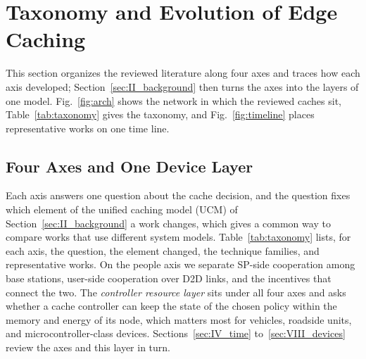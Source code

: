 \section{Taxonomy and Evolution of Edge Caching}
\label{sec:III_unified}

This section organizes the reviewed literature along four axes and traces how each axis developed; Section~\ref{sec:II_background} then turns the axes into the layers of one model. Fig.~\ref{fig:arch} shows the network in which the reviewed caches sit, Table~\ref{tab:taxonomy} gives the taxonomy, and Fig.~\ref{fig:timeline} places representative works on one time line.



\subsection{Four Axes and One Device Layer}
Each axis answers one question about the cache decision, and the question fixes which element of the unified caching model (UCM) of Section~\ref{sec:II_background} a work changes, which gives a common way to compare works that use different system models. Table~\ref{tab:taxonomy} lists, for each axis, the question, the element changed, the technique families, and representative works. On the people axis we separate SP-side cooperation among base stations, user-side cooperation over D2D links, and the incentives that connect the two. The \emph{controller resource layer} sits under all four axes and asks whether a cache controller can keep the state of the chosen policy within the memory and energy of its node, which matters most for vehicles, roadside units, and microcontroller-class devices. Sections~\ref{sec:IV_time} to~\ref{sec:VIII_devices} review the axes and this layer in turn.

